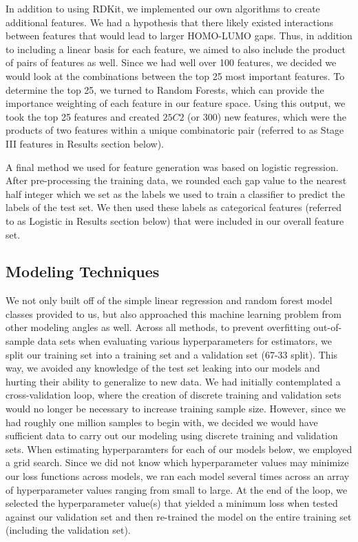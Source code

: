 \documentclass[11pt, oneside]{article}   	%
\begin{document}
In addition to using RDKit, we implemented our own algorithms to create additional features. We had a hypothesis that there likely existed interactions between features that would lead to larger HOMO-LUMO gaps. Thus, in addition to including a linear basis for each feature, we aimed to also include the product of pairs of features as well. Since we had well over 100 features, we decided we would look at the combinations between the top 25 most important features. To determine the top 25, we turned to Random Forests, which can provide the importance weighting of each feature in our feature space. Using this output, we took the top 25 features and created $25C2$ (or 300) new features, which were the products of two features within a unique combinatoric pair (referred to as Stage III features in Results section below). 

A final method we used for feature generation was based on logistic regression. After pre-processing the training data, we rounded each gap value to the nearest half integer which we set as the labels we used to train a classifier to predict the labels of the test set. We then used these labels as categorical features (referred to as Logistic in Results section below) that were included in our overall feature set. 

\subsection{Modeling Techniques} 

We not only built off of the simple linear regression and random forest model classes provided to us, but also approached this machine learning problem from other modeling angles as well. Across all methods, to prevent overfitting out-of-sample data sets when evaluating various hyperparameters for estimators, we split our training set into a training set and a validation set (67-33 split). This way, we avoided any knowledge of the test set leaking into our models and hurting their ability to generalize to new data. We had initially contemplated a cross-validation loop, where the creation of discrete training and validation sets would no longer be necessary to increase training sample size. However, since we had roughly one million samples to begin with, we decided we would have sufficient data to carry out our modeling using discrete training and validation sets. When estimating hyperparamters for each of our models below, we employed a grid search. Since we did not know which hyperparameter values may minimize our loss functions across models, we ran each model several times across an array of hyperparameter values ranging from small to large. At the end of the loop, we selected the hyperparameter value(s) that yielded a minimum loss when tested against our validation set and then re-trained the model on the entire training set (including the validation set).
\end{document}

